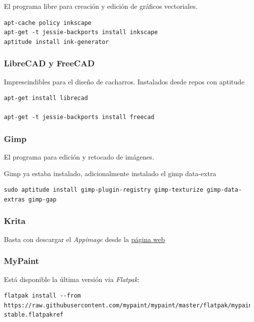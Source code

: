 \documentclass[12pt,spanish,]{scrartcl}
\begin{document}
El programa libre para creación y edición de gráficos vectoriales.

\begin{verbatim}
apt-cache policy inkscape
apt-get -t jessie-backports install inkscape
aptitude install ink-generator
\end{verbatim}

\hypertarget{librecad-y-freecad}{%
\subsubsection{LibreCAD y FreeCAD}\label{librecad-y-freecad}}

Imprescindibles para el diseño de cacharros. Instalados desde repos con
aptitude

\begin{verbatim}
apt-get install librecad

apt-get -t jessie-backports install freecad
\end{verbatim}

\hypertarget{gimp}{%
\subsubsection{Gimp}\label{gimp}}

El programa para edición y retocado de imágenes.

Gimp ya estaba instalado, adicionalmente instalado el gimp data-extra

\begin{verbatim}
sudo aptitude install gimp-plugin-registry gimp-texturize gimp-data-extras gimp-gap
\end{verbatim}

\hypertarget{krita}{%
\subsubsection{Krita}\label{krita}}

Basta con descargar el \emph{Appimage} desde la
\href{https://krita.org}{página web}

\hypertarget{mypaint}{%
\subsubsection{MyPaint}\label{mypaint}}

Está disponible la última versión via \emph{Flatpak}:

\begin{verbatim}
flatpak install --from https://raw.githubusercontent.com/mypaint/mypaint/master/flatpak/mypaint-stable.flatpakref
\end{verbatim}
\end{document}
